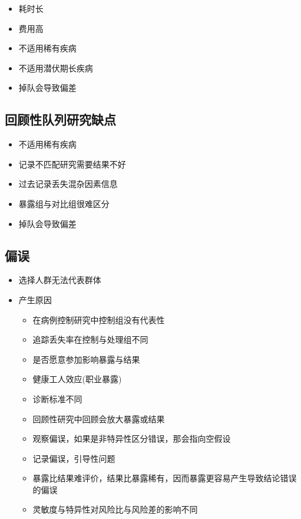 \documentclass[]{book}
\providecommand{\tightlist}{%
  \setlength{\itemsep}{0pt}\setlength{\parskip}{0pt}}
\begin{document}
\begin{itemize}
\tightlist
\item
  耗时长
\item
  费用高
\item
  不适用稀有疾病
\item
  不适用潜伏期长疾病
\item
  掉队会导致偏差
\end{itemize}

\subsection{回顾性队列研究缺点}

\begin{itemize}
\tightlist
\item
  不适用稀有疾病
\item
  记录不匹配研究需要结果不好
\item
  过去记录丢失混杂因素信息
\item
  暴露组与对比组很难区分
\item
  掉队会导致偏差
\end{itemize}

\subsection{偏误}

\begin{itemize}
\tightlist
\item
  选择人群无法代表群体
\item
  产生原因

  \begin{itemize}
  \tightlist
  \item
    在病例控制研究中控制组没有代表性
  \item
    追踪丢失率在控制与处理组不同
  \item
    是否愿意参加影响暴露与结果
  \item
    健康工人效应(职业暴露)
  \item
    诊断标准不同
  \item
    回顾性研究中回顾会放大暴露或结果
  \item
    观察偏误，如果是非特异性区分错误，那会指向空假设
  \item
    记录偏误，引导性问题
  \item
    暴露比结果难评价，结果比暴露稀有，因而暴露更容易产生导致结论错误的偏误
  \item
    灵敏度与特异性对风险比与风险差的影响不同
  \end{itemize}
\end{itemize}
\end{document}
